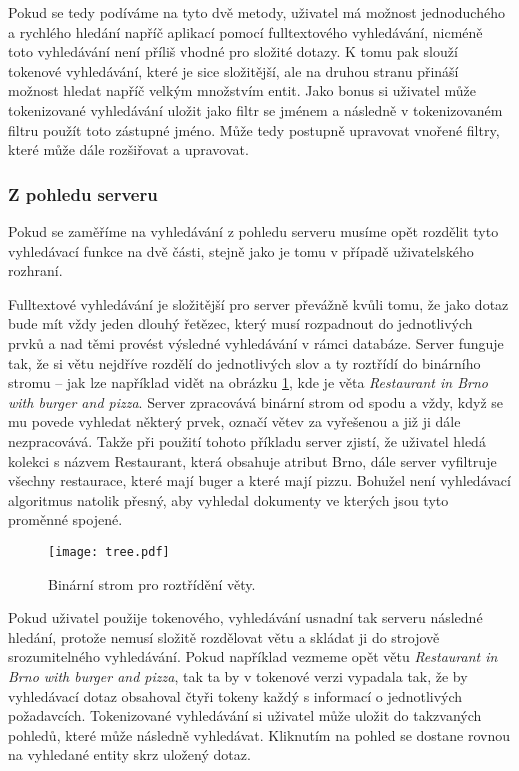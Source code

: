 \par Pokud se tedy podíváme na tyto dvě metody, uživatel má možnost jednoduchého a rychlého hledání napříč aplikací pomocí fulltextového vyhledávání, nicméně toto vyhledávání není příliš vhodné pro složité dotazy. K tomu pak slouží tokenové vyhledávání, které je sice složitější, ale na druhou stranu přináší možnost hledat napříč velkým množstvím entit. Jako bonus si uživatel může tokenizované vyhledávání uložit jako filtr se jménem a následně v tokenizovaném filtru použít toto zástupné jméno. Může tedy postupně upravovat vnořené filtry, které může dále rozšiřovat a upravovat.

\subsubsection{Z pohledu serveru}
\par Pokud se zaměříme na vyhledávání z pohledu serveru musíme opět rozdělit tyto vyhledávací funkce na dvě části, stejně jako je tomu v případě uživatelského rozhraní.

\par Fulltextové vyhledávání je složitější pro server převážně kvůli tomu, že jako dotaz bude mít vždy jeden dlouhý řetězec, který musí rozpadnout do jednotlivých prvků a nad těmi provést výsledné vyhledávání v rámci databáze. Server funguje tak, že si větu nejdříve rozdělí do jednotlivých slov a ty roztřídí do binárního stromu -- jak lze například vidět na obrázku \ref{binarni-strom}, kde je věta \textit{Restaurant in Brno with burger and pizza}. Server zpracovává binární strom od spodu a vždy, když se mu povede vyhledat některý prvek, označí větev za vyřešenou a již ji dále nezpracovává. Takže při použití tohoto příkladu server zjistí, že uživatel hledá kolekci s názvem Restaurant, která obsahuje atribut Brno, dále server vyfiltruje všechny restaurace, které mají buger a které mají pizzu. Bohužel není vyhledávací algoritmus natolik přesný, aby vyhledal dokumenty ve kterých jsou tyto proměnné spojené.

\begin{figure}[!htb]
\centering
\texttt{[image: tree.pdf]}
\caption{Binární strom pro roztřídění věty.}
\label{binarni-strom}
\end{figure}

\par Pokud uživatel použije tokenového, vyhledávání usnadní tak serveru následné hledání, protože nemusí složitě rozdělovat větu a skládat ji do strojově srozumitelného vyhledávání. Pokud například vezmeme opět větu \textit{Restaurant in Brno with burger and pizza}, tak ta by v tokenové verzi vypadala tak, že by vyhledávací dotaz obsahoval čtyři tokeny každý s informací o jednotlivých požadavcích. Tokenizované vyhledávání si uživatel může uložit do takzvaných pohledů, které může následně vyhledávat. Kliknutím na pohled se dostane rovnou na vyhledané entity skrz uložený dotaz.

